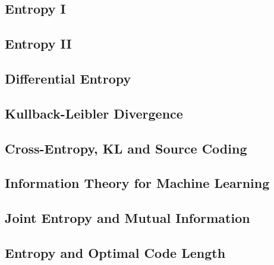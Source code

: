 
\subsection{Entropy I}


\subsection{Entropy II}


\subsection{Differential Entropy}


\subsection{Kullback-Leibler Divergence}


\subsection{Cross-Entropy, KL and Source Coding}


\subsection{Information Theory for Machine Learning}


\subsection{Joint Entropy and Mutual Information}


\subsection{Entropy and Optimal Code Length}




